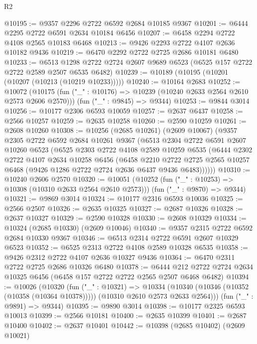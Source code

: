 \begin{lexlean}{R2}
\begin{coremodule}
@10195 := @9357 @2296 @2722 @6592 @2684 @10185 @9367
@10201 := @6444 @2295 @2722 @6591 @2634 @10184 @6456
@10207 := @6458 @2294 @2722 @4108 @2565 @10183 @6468
@10213 := @9426 @2293 @2722 @4107 @2636 @10182 @9436
@10219 := @6470 @2292 @2722 @2725 @2686 @10181 @6480
@10233 := @6513 @1298 @2722 @2724 @2607 @9689 @6523 (@6525 @157 @2722 @2722 @2589 @2507 @6535 @6482)
@10239 := @10189 (@10195 (@10201 (@10207 (@10213 (@10219 @10233)))))
@10240 := @10164 @2683
@10252 := @10072
    (@10175 (fun ("_" : @10176) => @10239 (@10240 @2633 @2564 @2610 @2573 @2606 @2570)))
    (fun ("_" : @9845) => @9344)
@10253 := @9844 @3014
@10256 := @10177 @2306 @6593 @10059
@10257 := @2637 @6437
@10258 := @2566 @10257
@10259 := @2635 @10258
@10260 := @2590 @10259
@10261 := @2608 @10260
@10308 := @10256
    (@2685 @10261)
    (@2609 @10067)
    (@9357
      @2305
      @2722
      @6592
      @2684
      @10261
      @9367
      (@6513
        @2304
        @2722
        @6591
        @2607
        @10260
        @6523
        (@6525
          @2303
          @2722
          @4108
          @2589
          @10259
          @6535
          (@6444
            @2302
            @2722
            @4107
            @2634
            @10258
            @6456
            (@6458
              @2210
              @2722
              @2725
              @2565
              @10257
              @6468
              (@9426 @1286 @2722 @2724 @2636 @6437 @9436 @6483))))))
@10310 := @10240 @2606 @2570
@10320 := @10051
    (@10252 (fun ("_" : @10253) => @10308 (@10310 @2633 @2564 @2610 @2573)))
    (fun ("_" : @9870) => @9344)
@10321 := @9869 @3014
@10324 := @10177 @2316 @6593 @10036
@10325 := @2566 @2507
@10326 := @2635 @10325
@10327 := @2687 @10326
@10328 := @2637 @10327
@10329 := @2590 @10328
@10330 := @2608 @10329
@10334 := @10324 (@2685 @10330) (@2609 @10046)
@10340 := @9357 @2315 @2722 @6592 @2684 @10330 @9367
@10346 := @6513 @2314 @2722 @6591 @2607 @10329 @6523
@10352 := @6525 @2313 @2722 @4108 @2589 @10328 @6535
@10358 := @9426 @2312 @2722 @4107 @2636 @10327 @9436
@10364 := @6470 @2311 @2722 @2725 @2686 @10326 @6480
@10378 := @6444 @212 @2722 @2724 @2634 @10325 @6456 (@6458 @157 @2722 @2722 @2565 @2507 @6468 @6482)
@10394 := @10026
    (@10320
      (fun ("_" : @10321) =>
      @10334 (@10340 (@10346 (@10352 (@10358 (@10364 @10378))))) (@10310 @2610 @2573 @2633 @2564)))
    (fun ("_" : @9891) => @9344)
@10395 := @9890 @3014
@10398 := @10177 @2325 @6593 @10013
@10399 := @2566 @10181
@10400 := @2635 @10399
@10401 := @2687 @10400
@10402 := @2637 @10401
@10442 := @10398
    (@2685 @10402)
    (@2609 @10021)

\end{coremodule}
\end{lexlean}

